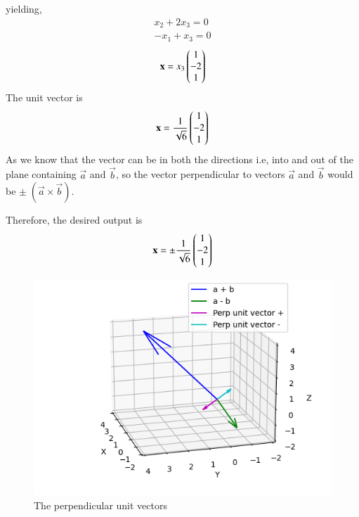 \documentclass[journal]{IEEEtran}
\begin{document}
yielding,
\begin{align}
    x_2+2x_3=0\\
    -x_1+x_3=0
\end{align}
\begin{align}
    \mathbf{x}=x_3\begin{pmatrix}1\\-2\\1\end{pmatrix}
\end{align}
The unit vector is 
\begin{align}
      \mathbf{x}=\frac{1}{\sqrt{6}}\begin{pmatrix}1\\-2\\1\end{pmatrix}
\end{align}
As we know that the vector can be in both the directions i.e, into and out of the plane containing $\vec{a}$ and $\vec{b}$, so the vector perpendicular to vectors $\vec{a}$ and $\vec{b}$ would be $\pm\;(\vec{a} \times \vec{b})$.

\quad 

Therefore, the desired output is
\begin{align}
    \mathbf{x}=\pm\frac{1}{\sqrt{6}}\begin{pmatrix}1\\-2\\1\end{pmatrix}
\end{align}

\newpage

 \begin{figure}
    \centering
    \includegraphics[width=\columnwidth]{figs/fig.png}
    \caption*{The perpendicular unit vectors}
    \label{fig:fig}
\end{figure}
\end{document}
